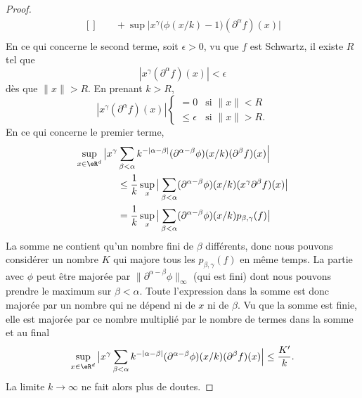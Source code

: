 \begin{proof}
\begin{equation}
\begin{aligned}[]
        &\quad+\sup \big| x^{\gamma}\big( \phi(x/k)-1 \big)(\partial^{\alpha}f)(x) \big|\\
        \end{aligned}
    \end{equation}
    En ce qui concerne le second terme, soit \( \epsilon>0\), vu que \( f\) est Schwartz, il existe \( R\) tel que
    \begin{equation}
        | x^{\gamma}(\partial^{\alpha}f)(x) |<\epsilon
    \end{equation}
    dès que \( \| x \|>R\). En prenant \( k>R\), 
    \begin{equation}
        | x^{\gamma}(\partial^{\alpha}f)(x) |\begin{cases}
            =0    &   \text{si } \| x \|<R\\
            \leq \epsilon    &    \text{si } \| x \|>R\text{.}
        \end{cases}
    \end{equation}
    En ce qui concerne le premier terme,
    \begin{subequations}
        \begin{align}
            \sup_{x\in \eR^d}\big| x^{\gamma}&\sum_{\beta<\alpha}k^{-|\alpha-\beta |}(\partial^{\alpha-\beta}\phi)(x/k)(\partial^{\beta}f)(x) \Big|\\
            &\leq \frac{1}{ k }\sup_{x}\big| \sum_{\beta<\alpha}(\partial^{\alpha-\beta}\phi)(x/k)(x^{\gamma}\partial^{\beta}f)(x) \big|\\
            &= \frac{1}{ k }\sup_{x}\big| \sum_{\beta<\alpha}(\partial^{\alpha-\beta}\phi)(x/k)  p_{\beta,\gamma}(f)   \big|
        \end{align}
    \end{subequations}
    La somme ne contient qu'un nombre fini de \( \beta\) différents, donc nous pouvons considérer un nombre \( K\) qui majore tous les \( p_{\beta,\gamma}(f)\) en même temps. La partie avec \( \phi\) peut être majorée par \( \| \partial^{\alpha-\beta}\phi \|_{\infty}\) (qui est fini) dont nous pouvons prendre le maximum sur \(\beta<\alpha\). Toute l'expression dans la somme est donc majorée par un nombre qui ne dépend ni de \( x\) ni de \( \beta\). Vu que la somme est finie, elle est majorée par ce nombre multiplié par le nombre de termes dans la somme et au final
    \begin{equation}
        \sup_{x\in \eR^d}\big| x^{\gamma}\sum_{\beta<\alpha}k^{-|\alpha-\beta |}(\partial^{\alpha-\beta}\phi)(x/k)(\partial^{\beta}f)(x) \Big|\leq \frac{ K' }{ k }.
    \end{equation}
    La limite \( k\to \infty\) ne fait alors plus de doutes.
\end{proof}

